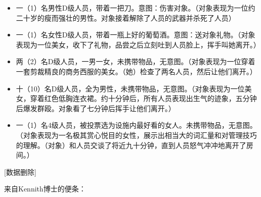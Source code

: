 \begin{itemize}
\item 一（1）名男性D级人员，带着一把刀。意图：伤害对象。（对象表现为一位约二十岁的瘦而强壮的男性。对象接着解除了人员的武器并杀死了人员）
\item 一（1）名女性D级人员，带着一瓶上好的葡萄酒。意图：送对象礼物。（对象表现为一位美女，收下了礼物，品尝之后立刻吐到人员脸上，挥手叫她离开。）
\item 两（2）名D级人员，一男一女，未携带物品，无意图。（对象表现为一位穿着一套剪裁精良的商务西服的美女。（她）检查了两名人员，然后让他们离开。）
\item 十（10）名D级人员，全为男性，未携带物品，无意图。（对象表现为一位美女，穿着红色低胸连衣裙。约十分钟后，所有人员表现出生气的迹象，五分钟后爆发群殴。对象看了七分钟后挥手让他们离开。）
\item 一（1）名4级人员，被投票选为设施内最好看的女人。未携带物品，无意图。（对象表现为一名极其赏心悦目的女性，展示出相当大的词汇量和对管理技巧的理解。（对象）和人员交谈了将近九十分钟，直到人员怒气冲冲地离开了房间。）
\end{itemize}

{[}数据删除]

来自Kennith博士的便条：

